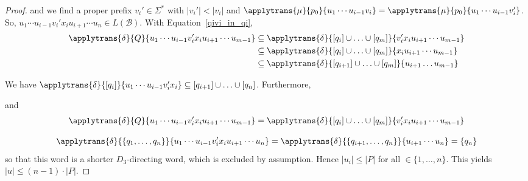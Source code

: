 \begin{proof}
 and we find a proper prefix $v_i' \in \Sigma^*$ with $|v_i'| < |v_i|$ 
 and 
 $\applytrans{\mu}{p_0}{u_1 \cdots u_{i-1} v_i} = \applytrans{\mu}{p_0}{u_1 \cdots u_{i-1} v_i'}$.
 So, $u_1 \cdots u_{i-1} v_i' x_i u_{i+1} \cdots u_n \in L(\mathcal B)$.
 With Equation~\eqref{qivi_in_qi},
 \begin{align*}
   \applytrans{\delta}{Q}{u_1 \cdots u_{i-1} v_i' x_i u_{i+1} \cdots u_{m-1}} 
    & \subseteq \applytrans{\delta}{[q_i] \cup \ldots \cup [q_m]}{v_i'x_i u_{i+1} \cdots u_{m-1}} \\
    & \subseteq \applytrans{\delta}{[q_i] \cup \ldots \cup [q_m]}{x_i u_{i+1}\cdots u_{m-1}} \\
    & \subseteq \applytrans{\delta}{[q_{i+1}] \cup \ldots \cup [q_m]}{u_{i+1}\ldots u_{m-1}}
 \end{align*}
 
 
 We have $\applytrans{\delta}{[q_i]}{u_1 \cdots u_{i-1} v_i'x_i}
 \subseteq [q_{i+1}] \cup \ldots \cup [q_n]$.
 Furthermore,
 
 and 
 \begin{multline*}
     \applytrans{\delta}{Q}{u_1 \cdots u_{i-1} v_i' x_i u_{i+1} \cdots u_{m-1}}
    =  \applytrans{\delta}{[q_i] \cup \ldots \cup [q_m]}{v_i' x_i u_{i+1} \cdots u_{m-1}}
 \end{multline*}
 
 
 
 \[
 \applytrans{\delta}{\{q_1, \ldots, q_n\}}{u_1 \cdots u_{i-1} v_i' x_i u_{i+1} \cdots u_n}
  = \applytrans{\delta}{\{q_{i+1},\ldots,q_n\}}{ u_{i+1} \cdots u_n }
  = \{q_n\}
 \]
 so that this word is a shorter $D_3$-directing
 word, which is excluded by assumption.
 Hence $|u_i| \le |P|$ for all $ \in \{1,\ldots,n\}$.
 This yields $|u| \le (n-1)\cdot |P|$.
 
 
 
\end{proof}
